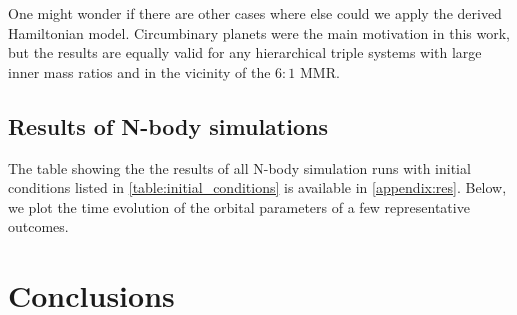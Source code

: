 \documentclass[ twoside,openright,titlepage,numbers=noenddot,headinclude,%
                footinclude=true,cleardoublepage=empty,abstractoff, %
                BCOR=5mm,paper=a4,fontsize=11pt,%
                american,%
                ]{scrreprt}
\begin{document}
One might wonder if there are other cases where else could we apply the 
derived Hamiltonian model. Circumbinary planets were the main motivation
in this work, but the results are equally valid for any hierarchical triple
systems with large inner mass ratios and in the vicinity of the $6:1$ MMR.

\section{Results of N-body simulations}
\label{sec:Comparison to the analytical model}
The table showing the the results of all N-body simulation runs with initial 
conditions listed in \cref{table:initial_conditions} 
is available in \cref{appendix:res}. Below, we plot the time evolution of the 
orbital parameters of a few representative outcomes.


\clearpage
\chapter{Conclusions}
\label{ch:conclusions}
\cleardoublepage
%
\cleardoublepage
\cleardoublepage
\cleardoublepage
\end{document}
